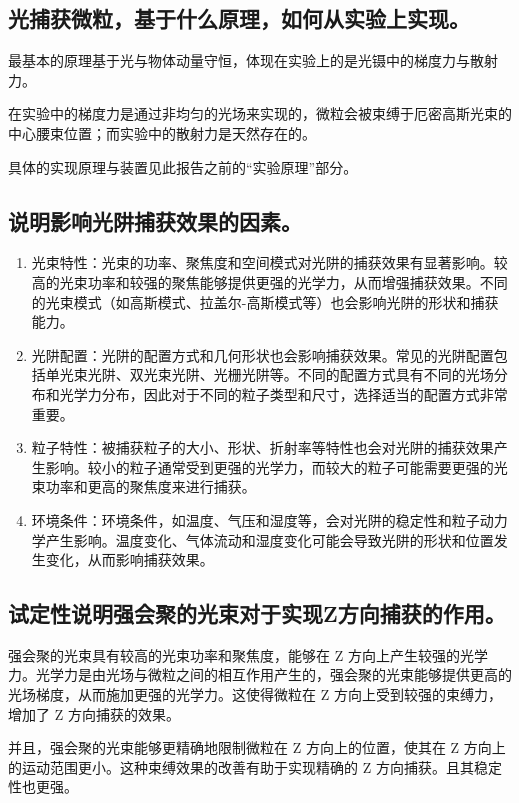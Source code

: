 \documentclass[a4paper,UTF8]{ctexart}
\begin{document}
\subsection{光捕获微粒，基于什么原理，如何从实验上实现。}

最基本的原理基于光与物体动量守恒，体现在实验上的是光镊中的梯度力与散射力。

在实验中的梯度力是通过非均匀的光场来实现的，微粒会被束缚于厄密高斯光束的中心腰束位置；而实验中的散射力是天然存在的。

具体的实现原理与装置见此报告之前的“实验原理”部分。

\subsection{说明影响光阱捕获效果的因素。}

\begin{enumerate}
    \item 光束特性：光束的功率、聚焦度和空间模式对光阱的捕获效果有显著影响。较高的光束功率和较强的聚焦能够提供更强的光学力，从而增强捕获效果。不同的光束模式（如高斯模式、拉盖尔-高斯模式等）也会影响光阱的形状和捕获能力。
    \item 光阱配置：光阱的配置方式和几何形状也会影响捕获效果。常见的光阱配置包括单光束光阱、双光束光阱、光栅光阱等。不同的配置方式具有不同的光场分布和光学力分布，因此对于不同的粒子类型和尺寸，选择适当的配置方式非常重要。
    \item 粒子特性：被捕获粒子的大小、形状、折射率等特性也会对光阱的捕获效果产生影响。较小的粒子通常受到更强的光学力，而较大的粒子可能需要更强的光束功率和更高的聚焦度来进行捕获。
    \item 环境条件：环境条件，如温度、气压和湿度等，会对光阱的稳定性和粒子动力学产生影响。温度变化、气体流动和湿度变化可能会导致光阱的形状和位置发生变化，从而影响捕获效果。
\end{enumerate}

\subsection{试定性说明强会聚的光束对于实现Z方向捕获的作用。}

强会聚的光束具有较高的光束功率和聚焦度，能够在 Z 方向上产生较强的光学力。光学力是由光场与微粒之间的相互作用产生的，强会聚的光束能够提供更高的光场梯度，从而施加更强的光学力。这使得微粒在 Z 方向上受到较强的束缚力，增加了 Z 方向捕获的效果。

并且，强会聚的光束能够更精确地限制微粒在 Z 方向上的位置，使其在 Z 方向上的运动范围更小。这种束缚效果的改善有助于实现精确的 Z 方向捕获。且其稳定性也更强。
\end{document}
